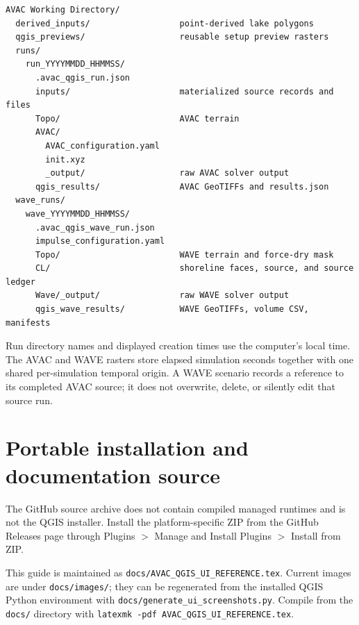 \documentclass[11pt,a4paper]{article}
\newcommand{\pathcode}[1]{\texttt{#1}}
\begin{document}
\begin{verbatim}
AVAC Working Directory/
  derived_inputs/                  point-derived lake polygons
  qgis_previews/                   reusable setup preview rasters
  runs/
    run_YYYYMMDD_HHMMSS/
      .avac_qgis_run.json
      inputs/                      materialized source records and files
      Topo/                        AVAC terrain
      AVAC/
        AVAC_configuration.yaml
        init.xyz
        _output/                   raw AVAC solver output
      qgis_results/                AVAC GeoTIFFs and results.json
  wave_runs/
    wave_YYYYMMDD_HHMMSS/
      .avac_qgis_wave_run.json
      impulse_configuration.yaml
      Topo/                        WAVE terrain and force-dry mask
      CL/                          shoreline faces, source, and source ledger
      Wave/_output/                raw WAVE solver output
      qgis_wave_results/           WAVE GeoTIFFs, volume CSV, manifests
\end{verbatim}

Run directory names and displayed creation times use the computer's local
time. The AVAC and WAVE rasters store elapsed simulation seconds together with
one shared per-simulation temporal origin. A WAVE scenario records a reference
to its completed AVAC source; it does not overwrite, delete, or silently edit
that source run.

\section{Portable installation and documentation source}

The GitHub source archive does not contain compiled managed runtimes and is not
the QGIS installer. Install the platform-specific ZIP from the GitHub Releases
page through Plugins $>$ Manage and Install Plugins $>$ Install from ZIP.

This guide is maintained as \pathcode{docs/AVAC\_QGIS\_UI\_REFERENCE.tex}.
Current images are under \pathcode{docs/images/}; they can be regenerated from
the installed QGIS Python environment with
\pathcode{docs/generate\_ui\_screenshots.py}. Compile from the
\pathcode{docs/} directory with \pathcode{latexmk -pdf
AVAC\_QGIS\_UI\_REFERENCE.tex}.
\end{document}
